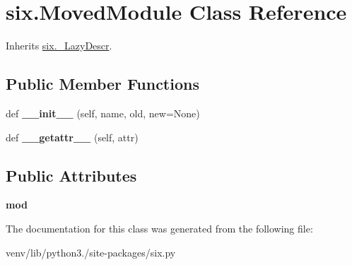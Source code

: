 \hypertarget{classsix_1_1_moved_module}{}\section{six.\+Moved\+Module Class Reference}
\label{classsix_1_1_moved_module}


Inherits \hyperlink{classsix_1_1___lazy_descr}{six.\+\_\+\+Lazy\+Descr}.

\subsection*{Public Member Functions}
\begin{DoxyCompactItemize}
\item 
\mbox{\label{classsix_1_1_moved_module_a72f33b603c6902f008c2f067b9096268}} 
def {\bfseries \+\_\+\+\_\+init\+\_\+\+\_\+} (self, name, old, new=None)
\item 
\mbox{\label{classsix_1_1_moved_module_a4ae5456b2eacd57cc5440f3cf9a2276b}} 
def {\bfseries \+\_\+\+\_\+getattr\+\_\+\+\_\+} (self, attr)
\end{DoxyCompactItemize}
\subsection*{Public Attributes}
\begin{DoxyCompactItemize}
\item 
\mbox{\label{classsix_1_1_moved_module_a5eb73a4cdceda205a0342cadabce63d9}} 
{\bfseries mod}
\end{DoxyCompactItemize}


The documentation for this class was generated from the following file\+:\begin{DoxyCompactItemize}
\item 
venv/lib/python3./site-\/packages/six.\+py\end{DoxyCompactItemize}
